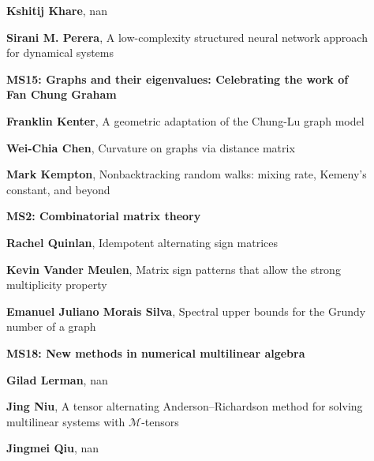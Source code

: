 \documentclass[ILAS2025-program.tex]{subfiles}
\begin{document}
\begin{description}
\begin{description}
        \item[] \textbf{Kshitij Khare}, nan
        \item[] \textbf{Sirani M. Perera}, A low-complexity structured neural network approach for dynamical systems
        \end{description}
    \begin{description}
    \item[] {\color{mstitle}\textbf{MS15: Graphs and their eigenvalues: Celebrating the work of Fan Chung Graham}} 
    \item[] \textbf{Franklin Kenter}, A geometric adaptation of the Chung-Lu graph model
        \item[] \textbf{Wei-Chia Chen}, Curvature on graphs via distance matrix
        \item[] \textbf{Mark Kempton}, Nonbacktracking random walks: mixing rate, Kemeny's constant, and beyond
        \end{description}
    \begin{description}
    \item[] {\color{mstitle}\textbf{MS2: Combinatorial matrix theory}} 
    \item[] \textbf{Rachel Quinlan}, Idempotent alternating sign matrices
        \item[] \textbf{Kevin Vander Meulen}, Matrix sign patterns that allow the strong multiplicity property
        \item[] \textbf{Emanuel Juliano Morais Silva}, Spectral upper bounds for the Grundy number of a graph
        \end{description}
    \begin{description}
    \item[] {\color{mstitle}\textbf{MS18: New methods in numerical multilinear algebra}} 
    \item[] \textbf{Gilad Lerman}, nan
        \item[] \textbf{Jing Niu}, A tensor alternating Anderson--Richardson method for solving multilinear systems with $ \mathcal{M} $-tensors
        \item[] \textbf{Jingmei Qiu}, nan
        \end{description}

\end{description}
\end{document}
